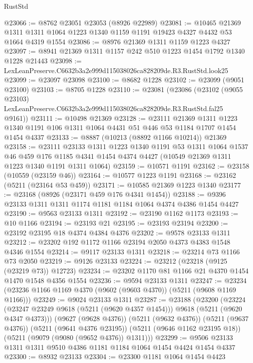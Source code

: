\begin{lexlean}{RustStd}
\begin{coremodule}
@23066 := @8762 @23051 @23053 (@8926 @22989)
@23081 := @10465
    @21369
    @1311
    @1311
    @1064
    @1223
    @1340
    @1159
    @1191
    @19423
    @4327
    @4432
    @53
    @1664
    @4319
    @1554
@23086 := @8976 @21369 @1311 @1159 @1223 @4327
@23097 := @8941 @21369 @1311 @1157 @242 @510 @1223 @1454 @1792 @1340 @1228 @21443
@23098 := LexLeanPreserve.C6632b3a2e999d115038026ca828209de.R3.RustStd.look25
@23099 := @23097 @23098
@23100 := @8682 @1228
@23102 := @23099 (@9051 @23100)
@23103 := @8705 @1228
@23110 := @23081
    (@23086
      (@23102
        (@9055 @23103)
        LexLeanPreserve.C6632b3a2e999d115038026ca828209de.R3.RustStd.fal25
        @9161))
@23111 := @10498 @21369
@23128 := @23111
    @21369
    @1311
    @1223
    @1340
    @1191
    @106
    @1311
    @1064
    @4431
    @51
    @446
    @53
    @1184
    @1707
    @1454
    @1454
    @4337
@23133 := @8887 (@10213 (@8892 @1166 @10214)) @21369
@23158 := @23111
    @23133
    @1311
    @1223
    @1340
    @1191
    @53
    @1311
    @1064
    @1537
    @46
    @459
    @176
    @1185
    @4341
    @1454
    @4374
    @4427
    (@10549 @21369 @1311 @1223 @1340 @1191 @1311 @1064)
@23159 := @10571 @1191
@23162 := @23158 (@10559 (@23159 @46))
@23164 := @10577 @1223 @1191
@23168 := @23162 (@5211 (@23164 @53 @459))
@23171 := @10585 @21369 @1223 @1340
@23177 := @23168 (@8926 (@23171 @459 @176 @4341 @1454))
@23188 := @9396 @23133 @1311 @1311 @1174 @1181 @1184 @1064 @4374 @4386 @1454 @4427
@23190 := @9563 @23133 @1311
@23192 := @23190 @1162 @1173
@23193 := @10 @1166
@23194 := @23193 @21
@23195 := @23193 @23194
@23200 := @23192 @23195 @18 @4374 @4384 @4376
@23202 := @9578 @23133 @1311
@23212 := @23202 @192 @1172 @1166 @23194 @2050 @4373 @4383 @1548 @4346 @1554
@23214 := @9117 @23133 @1311
@23218 := @23214 @73 @1166 @73 @2050
@23219 := @9126 @23133
@23224 := @23212 (@23218 (@9125 (@23219 @73)) @12723)
@23234 := @23202 @1170 @81 @1166 @21 @4370 @1454 @1470 @1548 @4356 @1554
@23236 := @9594 @23133 @1311
@23247 := @23234 (@23236 @1166 @1169 @4370 (@9602 (@9603 @4370)) (@5211 (@9608 @1169 @1166)))
@23249 := @9024 @23133 @1311
@23287 := @23188
    (@23200
      (@23224 (@23247 @23249 @9618 (@5211 (@9620 @4357 @1454))) @9618 (@5211 (@9620 @4347 @4373)))
      (@9627 (@9628 @4376))
      (@5211 (@9632 @4376))
      (@5211 (@9637 @4376))
      (@5211 (@9641 @4376 @23195))
      (@5211 (@9646 @1162 @23195 @18))
      (@5211 (@9079 (@9080 (@9652 @4376)) @1311)))
@23299 := @9506 @23133 @1311 @1311 @9510 @4386 @1181 @1184 @1064 @1454 @4424 @1454 @4337
@23300 := @8932 @23133
@23304 := @23300 @1181 @1064 @1454 @4423

\end{coremodule}
\end{lexlean}
